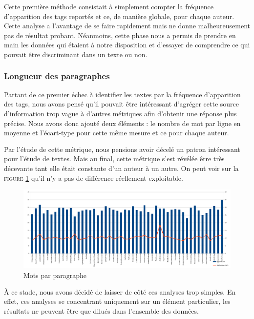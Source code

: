 \documentclass[a4paper,12pt]{report}
\begin{document}
Cette première méthode consistait à simplement compter la fréquence d'apparition des tags reportés et ce, de manière globale, pour chaque auteur. Cette analyse a l'avantage de se faire rapidement mais ne donne malheureusement pas de résultat probant. Néanmoins, cette phase nous a permis de prendre en main les données qui étaient à notre disposition et d'essayer de comprendre ce qui pouvait être discriminant dans un texte ou non.


\subsubsection{Longueur des paragraphes}

Partant de ce premier échec à identifier les textes par la fréquence d'apparition des tags, nous avons pensé qu'il pouvait être intéressant d’agréger cette source d'information trop vague à d'autres métriques afin d'obtenir une réponse plus précise. Nous avons donc ajouté deux éléments : le nombre de mot par ligne en moyenne et l'écart-type pour cette même mesure et ce pour chaque auteur.

Par l'étude de cette métrique, nous pensions avoir décelé un patron intéressant pour l'étude de textes. Mais au final, cette métrique s'est révélée être très décevante tant elle était constante d'un auteur à un autre. On peut voir sur la \textsc{figure \ref{WPL}} qu'il n'y a pas de différence réellement exploitable.
				
\begin{figure}[hbtp]
\centering
\includegraphics[width=15cm]{fig/WPL.png}
\caption{Mots par paragraphe}
\label{WPL}
\end{figure}

À ce stade, nous avons décidé de laisser de côté ces analyses trop simples. En effet, ces analyses se concentrant uniquement sur un élément particulier, les résultats ne peuvent être que dilués dans l'ensemble des données.
\end{document}
